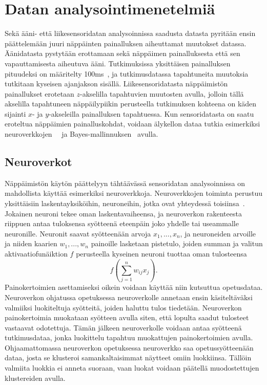 \documentclass[finnish]{tktltiki2}
\theoremstyle{definition}
\theoremstyle{remark}
\begin{document}
\section{Datan analysointimenetelmiä}
Sekä ääni- että liikesensoridatan analysoinnissa saadusta datasta pyritään ensin päättelemään juuri näppäinten painalluksen aiheuttamat muutokset datassa. Äänidatasta pystytään erottamaan sekä näppäimen painalluksesta että sen vapauttamisesta aiheutuva ääni. Tutkimuksissa yksittäisen painalluksen pituudeksi on määritelty 100ms~\cite{berger}, ja tutkimusdatassa tapahtuneita muutoksia tutkitaan kyseisen ajanjakson sisällä. Liikesensoridatasta näppäimistön painallukset erotetaan $z$-akselilla tapahtuvien muutosten avulla, jolloin tällä akselilla tapahtuneen näppäilypiikin perusteella tutkimuksen kohteena on käden sijainti $x$- ja $y$-akseleilla painalluksen tapahtuessa. Kun sensoridatasta on saatu eroteltua näppäimien painalluskohdat, voidaan älykellon dataa tutkia esimerkiksi neuroverkkojen~\cite{maiti}~\cite{liu} ja Bayes-mallinnuksen~\cite{mole} avulla.

\subsection{Neuroverkot}
Näppäimistön käytön päättelyyn tähtäävässä sensoridatan analysoinnissa on mahdollista käyttää esimerkiksi neuroverkkoja. Neuroverkkojen toiminta perustuu yksittäisiin laskentayksiköihin, neuroneihin, jotka ovat yhteydessä toisiinsa~\cite{ert}. Jokainen neuroni tekee oman laskentavaiheensa, ja neuroverkon rakenteesta riippuen antaa tuloksensa syötteenä eteenpäin joko yhdelle tai useammalle neuronille. Neuronit saavat syötteenään arvoja $x_1,..., x_n$, ja neuroneiden arvoille ja niiden kaarien $w_1,...,w_n$ painoille lasketaan pistetulo, joiden summan ja valitun aktivaatiofunäiktion $f$ perusteella kyseinen neuroni tuottaa oman tulosteensa $$f(\sum_{j=1}^{n} w_{ij}x_j).$$
Painokertoimien asettamiseksi oikein voidaan käyttää niin kutsuttua opetusdataa. Neuroverkon ohjatussa opetuksessa neuroverkolle annetaan ensin käsiteltäväksi valmiiksi luokiteltuja syötteitä, joiden haluttu tulos tiedetään. Neuroverkon painokertoimia muokataan syötteen avulla siten, että lopulta saadut tulosteet vastaavat odotettuja. Tämän jälkeen neuroverkolle voidaan antaa syötteenä tutkimusdataa, jonka luokittelu tapahtuu muokattujen painokertoimien avulla. Ohjaamattomassa neuroverkon opetuksessa neuroverkko saa opetussyötteenään dataa, josta se klusteroi samankaltaisimmat näytteet omiin luokkiinsa. Tällöin valmiita luokkia ei anneta suoraan, vaan luokat voidaan päätellä muodostettujen klustereiden avulla.
\end{document}
